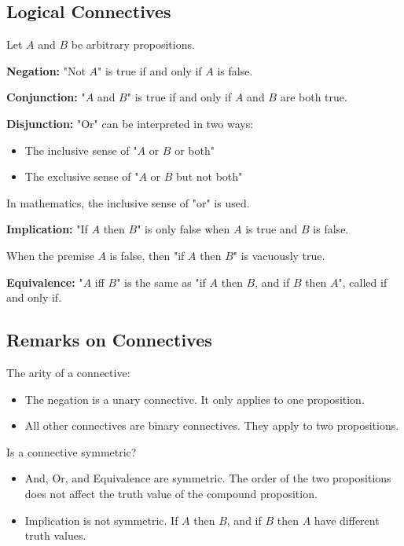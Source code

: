 \documentclass[11pt]{article}
\theoremstyle{definition}
\begin{document}
\subsection{Logical Connectives}
Let $A$ and $B$ be arbitrary propositions.

{\bf Negation:} "Not $A$" is true if and only if $A$ is false.

{\bf Conjunction:} "$A$ and $B$" is true if and only if $A$ and $B$ are both true.

{\bf Disjunction:} "Or" can be interpreted in two ways: 
\vspace{-0.25cm}
\begin{itemize}
    \item The inclusive sense of "$A$ or $B$ or both"
    \item The exclusive sense of "$A$ or $B$ but not both"
\end{itemize}
\vspace{-0.25cm}
In mathematics, the inclusive sense of "or" is used.

{\bf Implication:} "If $A$ then $B$" is only false when $A$ is true and $B$ is false. 

When the premise $A$ is false, then "if $A$ then $B$" is vacuously true.

{\bf Equivalence:} "$A$ iff $B$" is the same as "if $A$ then $B$, and if $B$ then $A$", called if and only if.

\subsection{Remarks on Connectives}
The arity of a connective:
\vspace{-0.25cm}
\begin{itemize}
    \item The negation is a unary connective. It only applies to one proposition.
    \item All other connectives are binary connectives. They apply to two propositions.
\end{itemize}
\vspace{-0.25cm}
Is a connective symmetric?
\vspace{-0.25cm}
\begin{itemize}
    \item And, Or, and Equivalence are symmetric. The order of the two propositions does not affect the truth value of the compound proposition.
    \item Implication is not symmetric. If $A$ then $B$, and if $B$ then $A$ have different truth values.
\end{itemize}
\end{document}
